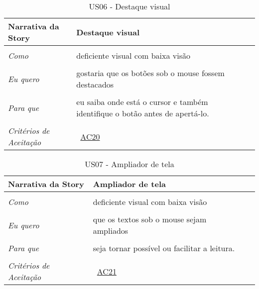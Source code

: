 \begin{apendicesenv}
\begin{table}[ht]
\centering
\caption{US06 - Destaque visual}
\vspace{0.1cm}
\begin{center}
\begin{tabularx}{\textwidth}{|lX|l|}

\hline 
\textbf{Narrativa da Story} & Destaque visual \\
\hline
 & \\
\textit{Como} & deficiente visual com baixa visão \\
 & \\
\textit{Eu quero} & gostaria que os botões sob o mouse fossem destacados \\
 & \\
\textit{Para que} & eu saiba onde está o cursor e também identifique o botão antes de apertá-lo. \\
 & \\
\hline
\textit{Critérios de Aceitação} & ~\hyperref[tab:us01a20]{AC20} \\
\hline

\end{tabularx}
\end{center}
\label{tab:us06}
\end{table}

\begin{table}[ht]
\centering
\caption{US07 - Ampliador de tela}
\vspace{0.1cm}
\begin{center}
\begin{tabularx}{\textwidth}{|lX|l|}

\hline 
\textbf{Narrativa da Story} & Ampliador de tela \\
\hline
 & \\
\textit{Como} & deficiente visual com baixa visão \\
 & \\
\textit{Eu quero} & que os textos sob o mouse sejam ampliados \\
 & \\
\textit{Para que} & seja tornar possível ou facilitar a leitura. \\
 & \\
\hline
\textit{Critérios de Aceitação} & ~\hyperref[tab:us01a21]{AC21} \\
\hline

\end{tabularx}
\end{center}
\label{tab:us07}
\end{table}


\end{apendicesenv}
